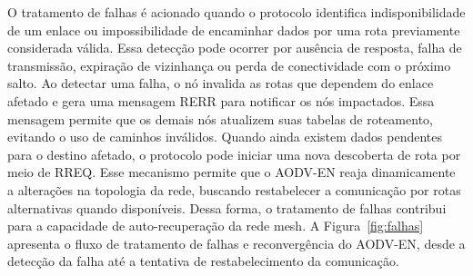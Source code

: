 O tratamento de falhas é acionado quando o protocolo identifica
indisponibilidade de um enlace ou impossibilidade de encaminhar dados
por uma rota previamente considerada válida. Essa detecção pode ocorrer
por ausência de resposta, falha de transmissão, expiração de vizinhança
ou perda de conectividade com o próximo salto. Ao detectar uma falha, o
nó invalida as rotas que dependem do enlace afetado e gera uma mensagem
RERR para notificar os nós impactados. Essa mensagem permite que os
demais nós atualizem suas tabelas de roteamento, evitando o uso de
caminhos inválidos. Quando ainda existem dados pendentes para o destino
afetado, o protocolo pode iniciar uma nova descoberta de rota por meio
de RREQ. Esse mecanismo permite que o AODV-EN reaja dinamicamente a
alterações na topologia da rede, buscando restabelecer a comunicação por
rotas alternativas quando disponíveis. Dessa forma, o tratamento de
falhas contribui para a capacidade de auto-recuperação da rede mesh. A
Figura~\ref{fig:falhas} apresenta o fluxo de tratamento de falhas e reconvergência do
AODV-EN, desde a detecção da falha até a tentativa de restabelecimento
da comunicação.
